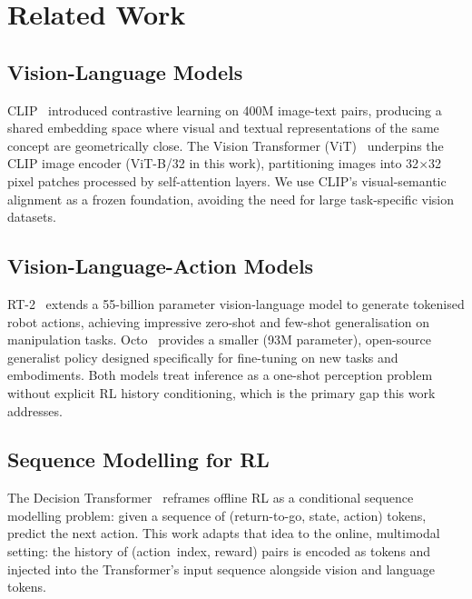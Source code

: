 \documentclass[12pt, a4paper]{article}
\begin{document}
\newpage

\section{Related Work}
\label{sec:related}

\subsection{Vision-Language Models}

CLIP~\cite{radford2021clip} introduced contrastive learning on 400M
image-text pairs, producing a shared embedding space where visual and textual
representations of the same concept are geometrically close.
The Vision Transformer (ViT)~\cite{dosovitskiy2021vit} underpins the CLIP
image encoder (ViT-B/32 in this work), partitioning images into 32$\times$32
pixel patches processed by self-attention layers.
We use CLIP's visual-semantic alignment as a frozen foundation, avoiding the
need for large task-specific vision datasets.

\subsection{Vision-Language-Action Models}

RT-2~\cite{brohan2023rt2} extends a 55-billion parameter vision-language
model to generate tokenised robot actions, achieving impressive zero-shot and
few-shot generalisation on manipulation tasks.
Octo~\cite{octo2024} provides a smaller (93M parameter), open-source
generalist policy designed specifically for fine-tuning on new tasks and
embodiments.
Both models treat inference as a one-shot perception problem without explicit
RL history conditioning, which is the primary gap this work addresses.

\subsection{Sequence Modelling for RL}

The Decision Transformer~\cite{chen2021decision} reframes offline RL as a
conditional sequence modelling problem: given a sequence of
(return-to-go, state, action) tokens, predict the next action.
This work adapts that idea to the online, multimodal setting: the history of
(action~index, reward) pairs is encoded as tokens and injected into the
Transformer's input sequence alongside vision and language tokens.
\end{document}
